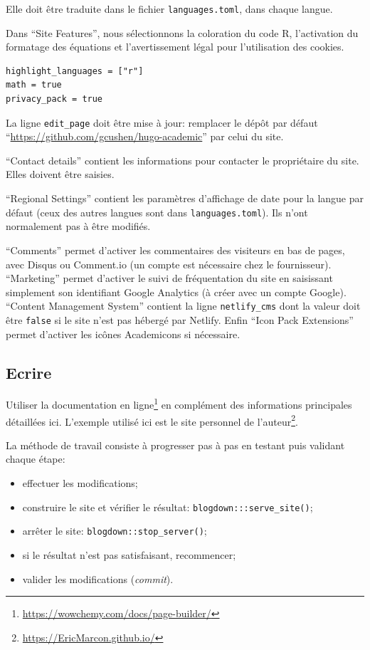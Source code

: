 \documentclass[
  12pt,
  french,
  a4paper,
  extrafontsizes,onecolumn,openright
  ]{memoir}
\providecommand{\tightlist}{%
  \setlength{\itemsep}{0pt}\setlength{\parskip}{0pt}}
\begin{document}
Elle doit être traduite dans le fichier \texttt{languages.toml}, dans chaque langue.

Dans \enquote{Site Features}, nous sélectionnons la coloration du code R, l'activation du formatage des équations et l'avertissement légal pour l'utilisation des cookies.

\begin{verbatim}
highlight_languages = ["r"] 
math = true
privacy_pack = true
\end{verbatim}

La ligne \texttt{edit\_page} doit être mise à jour: remplacer le dépôt par défaut \enquote{\url{https://github.com/gcushen/hugo-academic}} par celui du site.

\enquote{Contact details} contient les informations pour contacter le propriétaire du site.
Elles doivent être saisies.

\enquote{Regional Settings} contient les paramètres d'affichage de date pour la langue par défaut (ceux des autres langues sont dans \texttt{languages.toml}).
Ils n'ont normalement pas à être modifiés.

\enquote{Comments} permet d'activer les commentaires des visiteurs en bas de pages, avec Disqus ou Comment.io (un compte est nécessaire chez le fournisseur).
\enquote{Marketing} permet d'activer le suivi de fréquentation du site en saisissant simplement son identifiant Google Analytics (à créer avec un compte Google).
\enquote{Content Management System} contient la ligne \texttt{netlify\_cms} dont la valeur doit être \texttt{false} si le site n'est pas hébergé par Netlify.
Enfin \enquote{Icon Pack Extensions} permet d'activer les icônes Academicons si nécessaire.

\subsection{Ecrire}\label{ecrire-3}

Utiliser la documentation en ligne\footnote{\url{https://wowchemy.com/docs/page-builder/}} en complément des informations principales détaillées ici.
L'exemple utilisé ici est le site personnel de l'auteur\footnote{\url{https://EricMarcon.github.io/}}.

La méthode de travail consiste à progresser pas à pas en testant puis validant chaque étape:

\begin{itemize}
\tightlist
\item
  effectuer les modifications;
\item
  construire le site et vérifier le résultat: \texttt{blogdown:::serve\_site()};
\item
  arrêter le site: \texttt{blogdown::stop\_server()};
\item
  si le résultat n'est pas satisfaisant, recommencer;
\item
  valider les modifications (\emph{commit}).
\end{itemize}
\end{document}
